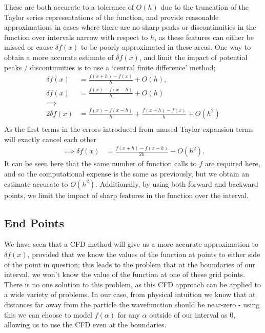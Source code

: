 These are both accurate to a tolerance of $O(h)$ due to the truncation of the Taylor series representations of the function, and provide reasonable approximations in cases where there are no sharp peaks or discontinuities in the function over intervals narrow with respect to $h$, as these features can either be missed or cause $\delta f(x)$ to be poorly approximated in these areas. One way to obtain a more accurate estimate of $\delta f(x)$, and limit the impact of potential peaks / discontinuities is to use a `central finite difference' method;
\begin{align*}
	\delta f\left(x\right) &= \frac{f\left(x + h\right) - f\left(x\right)}{h} + O(h),\\
	\delta f\left(x\right) &= \frac{f\left(x\right) - f\left(x - h\right)}{h} + O(h)\\
	\implies&\\
	2\delta f\left(x\right) &= \frac{f\left(x\right) - f\left(x - h\right)}{h} + \frac{f\left(x + h\right) - f\left(x\right)}{h} + O\left(h^{2}\right)\\
\end{align*}
	As the first terms in the errors introduced from unused Taylor expansion terms will exactly cancel each other
\begin{align*}
	\implies \delta f\left(x\right) &= \frac{f\left(x + h\right) - f\left(x - h\right)}{2h} + O\left(h^{2}\right).
\end{align*}
It can be seen here that the same number of function calls to $f$ are required here, and so the computational expense is the same as previously, but we obtain an estimate accurate to $O(h^{2})$. Additionally, by using both forward and backward points, we limit the impact of sharp features in the function over the interval.

\subsection{End Points}
We have seen that a CFD method will give us a more accurate approximation to $\delta f(x)$, provided that we know the values of the function at points to either side of the point in question; this leads to the problem that at the boundaries of our interval, we won't know the value of the function at one of these grid points. There is no one solution to this problem, as this CFD approach can be applied to a wide variety of problems. In our case, from physical intuition we know that at distances far away from the particle the wavefunction should be near-zero - using this we can choose to model $f(\alpha)$ for any $\alpha$ outside of our interval as $0$, allowing us to use the CFD even at the boundaries.

